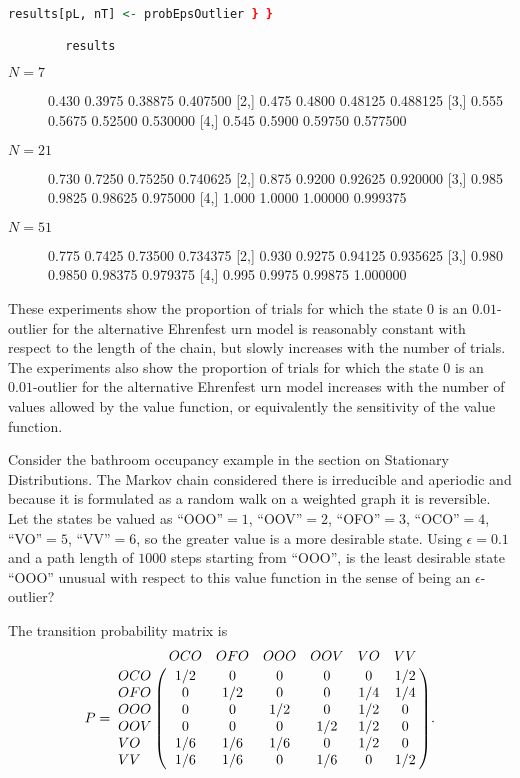 \documentclass[12pt]{article}
\begin{document}
\begin{solution}
\begin{lstlisting}[language=R]
        results[pL, nT] <- probEpsOutlier } }

        results
    \end{lstlisting}

    \begin{description}
        \item[\( N= 7 \)]
\begin{verbatim*}
        [,1]   [,2]    [,3]     [,4]
[1,] 0.430 0.3975 0.38875 0.407500
[2,] 0.475 0.4800 0.48125 0.488125
[3,] 0.555 0.5675 0.52500 0.530000
[4,] 0.545 0.5900 0.59750 0.577500
\end{verbatim*}
        \item[\( N = 21 \)]
\begin{verbatim*}
      [,1]   [,2]    [,3]     [,4]
[1,] 0.730 0.7250 0.75250 0.740625
[2,] 0.875 0.9200 0.92625 0.920000
[3,] 0.985 0.9825 0.98625 0.975000
[4,] 1.000 1.0000 1.00000 0.999375
\end{verbatim*}
        \item[\( N = 51 \)]
\begin{verbatim*}
      [,1]   [,2]    [,3]     [,4]
[1,] 0.775 0.7425 0.73500 0.734375
[2,] 0.930 0.9275 0.94125 0.935625
[3,] 0.980 0.9850 0.98375 0.979375
[4,] 0.995 0.9975 0.99875 1.000000
\end{verbatim*}
    \end{description}

These experiments show the proportion of trials for which the state \( 0
\) is an \( 0.01 \)-outlier for the alternative Ehrenfest urn model is
reasonably constant with respect to the length of the chain, but slowly
increases with the number of trials.  The experiments also show the
proportion of trials for which the state \( 0 \) is an \( 0.01 \)-outlier
for the alternative Ehrenfest urn model increases with the number of
values allowed by the value function, or equivalently the sensitivity of
the value function.
\end{solution}

\begin{exercise}
    Consider the bathroom occupancy example in the section on Stationary
    Distributions.  The Markov chain considered there is irreducible and
    aperiodic and because it is formulated as a random walk on a
    weighted graph it is reversible.  Let the states be valued as
    ``OOO''\( =1 \), ``OOV''\( =2 \), ``OFO''\( =3 \), ``OCO''\( =4 \),
    ``VO''\( =5 \), ``VV''\( =6 \), so the greater value is a more
    desirable state.  Using \( \epsilon=0.1 \) and a path length of \(
    1000 \) steps starting from ``OOO'', is the least desirable state
    ``OOO'' unusual with respect to this value function in the sense of
    being an \( \epsilon \)-outlier?

    The transition probability matrix is
    \[
        P= \bordermatrix{ & OCO & OFO & OOO & OOV & VO & VV \cr
        OCO & 1/2 & 0 & 0 & 0 & 0 & 1/2 \cr
        OFO & 0 & 1/2 & 0 & 0 & 1/4 & 1/4 \cr
        OOO & 0 & 0 & 1/2 & 0 & 1/2 & 0 \cr
        OOV & 0 & 0 & 0 & 1/2 & 1/2 & 0 \cr
        VO & 1/6 & 1/6 & 1/6 & 0 & 1/2 & 0 \cr
        VV & 1/6 & 1/6 & 0 & 1/6 & 0 & 1/2 \cr
        }.
    \]
\end{exercise}
\end{document}
